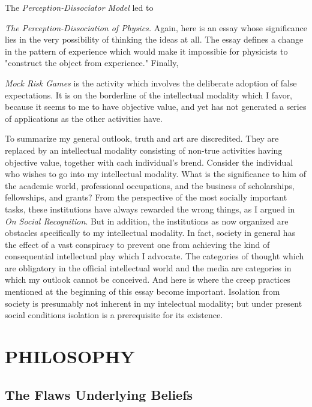 \documentclass[10pt,twoside]{memoir}
\newcommand{\essaytitle}[1]{
	\emph{#1}}
\begin{document}
The \essaytitle{Perception-Dissociator Model} led to 
\essaytitle{The Perception-Dissociation of Physics.} Again, here is an essay whose 
significance lies in the very possibility of thinking the ideas at all. The essay 
defines a change in the pattern of experience which would make it 
impossibie for physicists to "construct the object from experience." Finally, 
\essaytitle{Mock Risk Games} is the activity which involves the deliberate adoption of 
false expectations. It is on the borderline of the intellectual modality which I 
favor, because it seems to me to have objective value, and yet has not 
generated a series of applications as the other activities have. 

To summarize my general outlook, truth and art are discredited. They 
are replaced by an intellectual modality consisting of non-true activities 
having objective value, together with cach individual's brend. Consider the 
individual who wishes to go into my intellectual modality. What is the 
significance to him of the academic world, professional occupations, and the 
business of scholarships, fellowships, and grants? From the perspective of 
the most socially important tasks, these institutions have always rewarded 
the wrong things, as I argued in \essaytitle{On Social Recognition}. But in addition, the 
institutions as now organized are obstacles specifically to my intellectual 
modality. In fact, society in general has the effect of a vast conspiracy to 
prevent one from achieving the kind of consequential intellectual play which 
I advocate. The categories of thought which are obligatory in the official
intellectual world and the media are categories in which my outlook cannot 
be conceived. And here is where the creep practices mentioned at the 
beginning of this essay become important. Isolation from society is 
presumably not inherent in my intelectual modality; but under present 
social conditions isolation is a prerequisite for its existence. 


\part{PHILOSOPHY}


\chapter{The Flaws Underlying Beliefs}
\end{document}
